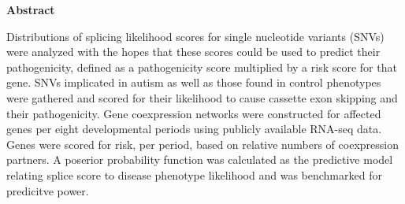 \thispagestyle{plain}
\begin{center}
    \textbf{Abstract}
\end{center}
Distributions of splicing likelihood scores for single nucleotide variants 
(SNVs) were analyzed with the hopes that these scores could be used to 
predict their pathogenicity, defined as a pathogenicity score multiplied by a 
risk score for that gene. SNVs implicated in autism as well as those found in
control phenotypes were gathered and scored for their likelihood to cause 
cassette exon skipping and their pathogenicity. Gene coexpression networks
were constructed for affected genes per eight developmental periods using
publicly available RNA-seq data. Genes were scored for risk, per period, 
based on relative numbers of coexpression partners. A poserior probability 
function was calculated as the predictive model relating splice score to
disease phenotype likelihood and was benchmarked for predicitve power.
